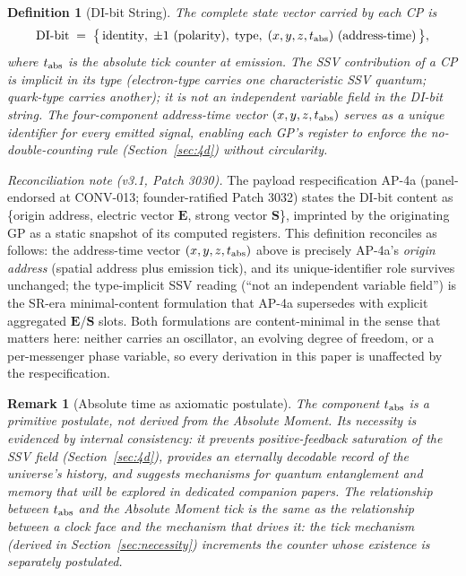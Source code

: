\documentclass[12pt]{article}
\newtheorem{definition}[theorem]{Definition}
\newtheorem{remark}[theorem]{Remark}
\begin{document}
\begin{definition}[DI-bit String]
The complete state vector carried by each CP is
\begin{equation}
  \text{DI-bit} \;=\;
  \bigl\{\,\text{identity},\; \pm1\ (\text{polarity}),\;
  \text{type},\; (x,y,z,t_{\rm abs})\ (\text{address-time})\,\bigr\},
  \label{eq:dibit}
\end{equation}
where $t_{\rm abs}$ is the absolute tick counter at emission.  The SSV
contribution of a CP is \emph{implicit in its type} (electron-type carries
one characteristic SSV quantum; quark-type carries another); it is
\emph{not} an independent variable field in the DI-bit string.  The
four-component address-time vector $(x,y,z,t_{\rm abs})$ serves as a
unique identifier for every emitted signal, enabling each GP's register
to enforce the no-double-counting rule (Section~\ref{sec:4d}) without
circularity.
\end{definition}

\noindent\emph{Reconciliation note (v3.1, Patch 3030).} The payload
respecification AP-4a (panel-endorsed at CONV-013; founder-ratified
Patch 3032) states the DI-bit content as \{origin address,
electric vector $\mathbf{E}$, strong vector $\mathbf{S}$\}, imprinted by
the originating GP as a static snapshot of its computed registers. This
definition reconciles as follows: the address-time vector
$(x,y,z,t_{\rm abs})$ above is precisely AP-4a's \emph{origin address}
(spatial address plus emission tick), and its unique-identifier role
survives unchanged; the type-implicit SSV reading (``not an independent
variable field'') is the SR-era minimal-content formulation that AP-4a
supersedes with explicit aggregated $\mathbf{E}$/$\mathbf{S}$ slots.
Both formulations are content-minimal in the sense that matters here:
neither carries an oscillator, an evolving degree of freedom, or a
per-messenger phase variable, so every derivation in this paper is
unaffected by the respecification.

\begin{remark}[Absolute time as axiomatic postulate]
The component $t_{\rm abs}$ is a \emph{primitive postulate}, not derived from
the Absolute Moment.  Its necessity is evidenced by internal consistency: it
prevents positive-feedback saturation of the SSV field
(Section~\ref{sec:4d}), provides an eternally decodable record of the
universe's history, and suggests mechanisms for quantum entanglement and
memory that will be explored in dedicated companion papers.  The relationship
between $t_{\rm abs}$ and the Absolute Moment tick is the same as the
relationship between a clock face and the mechanism that drives it: the tick
mechanism (derived in Section~\ref{sec:necessity}) increments the counter
whose existence is separately postulated.
\end{remark}
\end{document}
